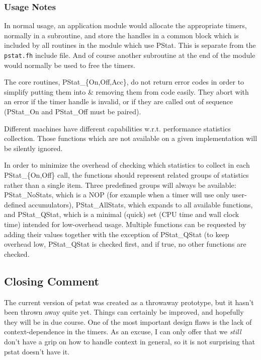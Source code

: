 \subsubsection{Usage Notes}
In normal usage, an application module would allocate the appropriate
timers, normally in a subroutine, and store the handles in a common
block which is included by all routines in the module which use
PStat.  This is separate from the \verb+pstat.fh+ include file.
And of course another subroutine at the end of the module would
normally be used to free the timers.

The core routines, PStat\_\{On,Off,Acc\}, do not return error codes in
order to simplify putting them into \& removing them from code easily.
They abort with an error if the timer handle is invalid, or if they
are called out of sequence (PStat\_On and PStat\_Off must be paired).

Different machines have different capabilities w.r.t. performance
statistics collection.  Those functions which are not available on a
given implementation will be silently ignored.  

In order to minimize the overhead of checking which statistics to
collect in each PStat\_\{On,Off\} call, the functions should represent
related groups of statistics rather than a single item.  Three
predefined groups will always be available: PStat\_NoStats, which is a
NOP (for example when a timer will use only user-defined
accumulators), PStat\_AllStats, which expands to all available
functions, and PStat\_QStat, which is a minimal (quick) set (CPU time
and wall clock time) intended for low-overhead usage.  Multiple
functions can be requested by adding their values together with the
exception of PStat\_QStat (to keep overhead low, PStat\_QStat is checked
first, and if true, no other functions are checked.

\subsection{Closing Comment}
The current version of pstat was created as a throwaway prototype, but
it hasn't been thrown away quite yet.  Things can certainly be
improved, and hopefully they will be in due course.  One of the most
important design flaws is the lack of context-dependence in the
timers. As an excuse, I can only offer that we {\em still} don't have
a grip on how to handle context in general, so it is not surprising
that pstat doesn't have it.

